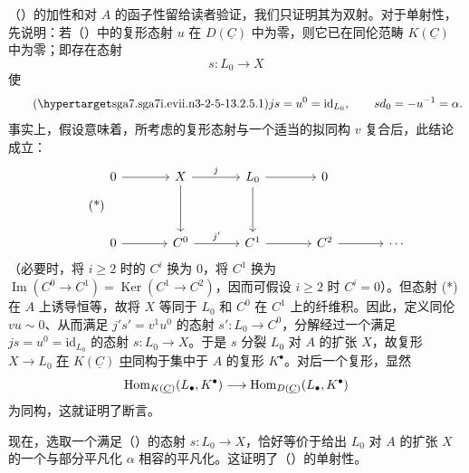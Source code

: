 （）的加性和对 $A$ 的函子性留给读者验证，我们只证明其为双射。对于单射性，先说明：若（）中的复形态射 $u$ 在 $D(\underline C)$ 中为零，则它已在同伦范畴 $K(\underline C)$ 中为零；即存在态射
\[
 s:L_0\longrightarrow X
\]
使
\begin{equation}\tag{\SGARefTarget{sga7.sga7i.evii.n3-2-5-1}{3.2.5.1}}
 js=u^0=\mathrm{id}_{L_0},
 \qquad sd_0=-u^{-1}=\alpha.
\end{equation}
事实上，假设意味着，所考虑的复形态射与一个适当的拟同构 $v$ 复合后，此结论成立：
\begin{equation}\tag{*}
\begin{tikzcd}[column sep=large,row sep=huge]
 0\arrow[r] & X\arrow[r,"j"]\arrow[d]
 & L_0\arrow[r]\arrow[d] & 0\\
 0\arrow[r] & C^0\arrow[r,"j'"] & C^1\arrow[r] & C^2\arrow[r] & \cdots
\end{tikzcd}
\end{equation}
（必要时，将 $i\geq2$ 时的 $C^i$ 换为 $0$，将 $C^1$ 换为 $\operatorname{Im}(C^0\longrightarrow C^1)=\operatorname{Ker}(C^1\longrightarrow C^2)$，因而可假设 $i\geq2$ 时 $C^i=0$）。但态射 (*) 在 $A$ 上诱导恒等，故将 $X$ 等同于 $L_0$ 和 $C^0$ 在 $C^1$ 上的纤维积。因此，定义同伦 $vu\sim0$、从而满足 $j's'=v^1u^0$ 的态射 $s':L_0\longrightarrow C^0$，分解经过一个满足 $js=u^0=\mathrm{id}_{L_0}$ 的态射 $s:L_0\longrightarrow X$。于是 $s$ 分裂 $L_0$ 对 $A$ 的扩张 $X$，故复形 $X\longrightarrow L_0$ \underline{在} $K(\underline C)$ \underline{中}同构于集中于 $A$ 的复形 $K^\bullet$。对后一个复形，显然
\[
 \Hom_{K(\underline C)}(L_\bullet,K^\bullet)
 \longrightarrow
 \Hom_{D(\underline C)}(L_\bullet,K^\bullet)
\]
为同构，这就证明了断言。

现在，选取一个满足（）的态射 $s:L_0\longrightarrow X$，恰好等价于给出 $L_0$ 对 $A$ 的扩张 $X$ 的一个与部分平凡化 $\alpha$ 相容的平凡化。这证明了（）的单射性。

